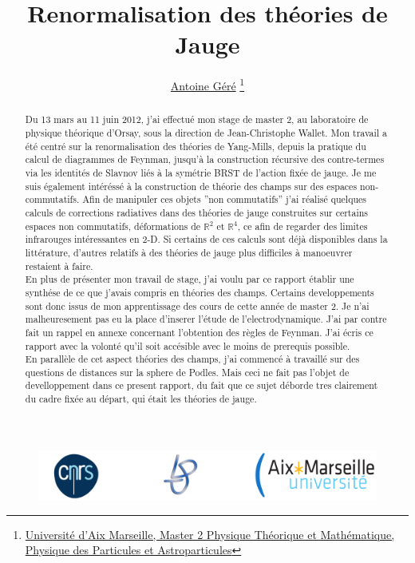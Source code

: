 \documentclass[a4paper,11pt]{article}
\title{Renormalisation des théories de Jauge}
\author{
\href{mailto:gereantoine@gmail.com}{Antoine Géré}
\footnote{
\href{http://marwww.in2p3.fr/Master_M2_P3TMA_Physique_Theorique_et_Mathematique_Physique_des_Particules_et_Astrophysique/
}{Université d'Aix Marseille, Master 2 Physique Théorique et Mathématique, Physique des Particules et Astroparticules}
}}
\theoremstyle{plain}
\theoremstyle{definition}
\theoremstyle{remark}
\numberwithin{equation}{section}
\numberwithin{equation}{subsection}
\numberwithin{figure}{section}
\begin{document}


\maketitle


\begin{abstract}

Du 13 mars au 11 juin 2012, j'ai effectué mon stage de master 2, au laboratoire de physique théorique d'Orsay, sous la direction de Jean-Christophe Wallet. Mon travail a été centré sur la renormalisation des théories de Yang-Mills, depuis la pratique du calcul de diagrammes de Feynman, jusqu’à la construction récursive des contre-termes via les identités de Slavnov liés à la symétrie BRST de l’action fixée de jauge. Je me suis également intéréssé à la construction de théorie des champs sur des espaces non-commutatifs. Afin de manipuler ces objets ''non commutatifs'' j'ai réalisé quelques calculs de corrections radiatives dans des théories de jauge construites sur certains espaces non commutatifs, déformations de $\mathbb{R}^2$ et $\mathbb{R}^4$, ce afin de regarder des limites infrarouges  intéressantes en 2-D. Si certains de ces calculs sont déjà disponibles dans la littérature, d’autres relatifs à des théories de jauge plus difficiles à manoeuvrer restaient à faire.\\

En plus de présenter mon travail de stage, j'ai voulu par ce rapport établir une synthése de ce que j'avais compris en théories des champs. Certains developpements sont donc issus de mon apprentissage des cours de cette année de master 2. Je n'ai malheuresement pas eu la place d'inserer l'étude de l'electrodynamique.  J'ai par contre fait un rappel en annexe concernant l'obtention des règles de Feynman. J'ai écris ce rapport avec la volonté qu'il soit accésible avec le moins de prerequis possible.\\

En parallèle de cet aspect théories des champs, j'ai commencé à travaillé sur des questions de distances sur la sphere de Podles. Mais ceci ne fait pas l'objet de develloppement dans ce present rapport, du fait que ce sujet déborde tres clairement du cadre fixée au départ, qui était les théories de jauge.

\end{abstract}


\begin{figure}[b]
\begin{center}
\includegraphics[scale=0.4]{logoRapport.jpg}
\end{center}
\end{figure}
\end{document}
